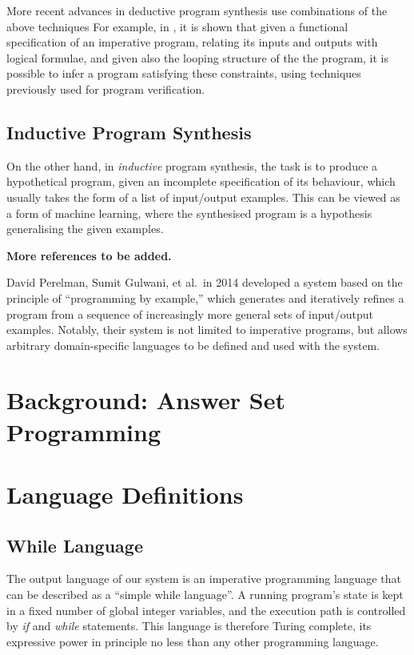 \documentclass[a4paper,twoside,notitlepage]{article}
\begin{document}
More recent advances in deductive program synthesis use combinations of the 
above techniques For example, in \cite{popl10syn}, it is shown that given a 
functional specification of an imperative program, relating its inputs and 
outputs with logical formulae, and given also the looping structure of the the 
program, it is possible to infer a program satisfying these constraints, using 
techniques previously used for program verification.

\subsection{Inductive Program Synthesis}

On the other hand, in \emph{inductive} program synthesis, the task is to 
produce a hypothetical program, given an incomplete specification of its 
behaviour, which usually takes the form of a list of input/output examples. 
This can be viewed as a form of machine learning, where the synthesised 
program is a hypothesis generalising the given examples.

\textbf{More references to be added.}

David Perelman, Sumit Gulwani, et al.\ in 2014 developed a system\cite{tds} 
based on the principle of ``programming by example,'' which generates and 
iteratively refines a program from a sequence of increasingly more general 
sets of input/output examples. Notably, their system is not limited to 
imperative programs, but allows arbitrary domain-specific languages to be 
defined and used with the system.

\section{Background: Answer Set Programming} \label{sec:bkgasp}

\section{Language Definitions}

\subsection{While Language} \label{sec:whilan}

The output language of our system is an imperative programming language that 
can be described as a ``simple while language''. A running program's state is 
kept in a fixed number of global integer variables, and the execution path is 
controlled by \emph{if} and \emph{while} statements. This language is 
therefore Turing complete, its expressive power in principle no less than any 
other programming language.
\end{document}
